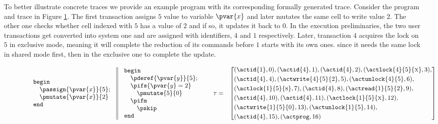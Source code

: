 To better illustrate concrete traces we provide an example program with its corresponding formally generated trace. Consider the program and trace in Figure \ref{fig:2pltrace}. The first transaction assigns $5$ value to variable $\pvar{x}$ and later mutates the same cell to write value $2$. The other one checks whether cell indexed with $5$ has a value of $2$ and if so, it updates it back to $0$. In the execution preliminaries, the two user transactions get converted into system one and are assigned with identifiers, $4$ and $1$ respectively. Later, transaction $4$ acquires the lock on $5$ in exclusive mode, meaning it will complete the reduction of its commands before $1$ starts with its own ones. since it needs the same lock in shared mode first, then in the exclusive one to complete the update.

\begin{figure}
\[
	\begin{array}{l r}
		\begin{array}{l || l}
			\begin{array}{l}
				\mathtt{begin} \\
					\quad \passign{\pvar{x}}{5} ; \\
					\quad \pmutate{\pvar{x}}{2} \\
				\mathtt{end}
			\end{array}
				&
			\begin{array}{l}
				\mathtt{begin} \\
					\quad \pderef{\pvar{y}}{5} ; \\
					\quad \pifs{\pvar{y} = 2} \\
					\quad \quad \pmutate{5}{0} \\
					\quad \pifm \\
					\quad \quad \pskip \\
				\mathtt{end}
			\end{array}
		\end{array}
		&
		\begin{array}{r l}
			\tau =
			&
			\left[
			\begin{aligned}
				&(\actid{1}, 0), (\actid{4}, 1), (\actid{4}, 2), (\actlock{4}{5}{\textsc{x}}, 3), \\
				&(\actid{4}, 4), (\actwrite{4}{5}{2}, 5), (\actunlock{4}{5}, 6), \\
				&(\actlock{1}{5}{\textsc{s}}, 7), (\actid{4}, 8), (\actread{1}{5}{2}, 9), \\
				&(\actid{4}, 10), (\actid{4}, 11), (\actlock{1}{5}{\textsc{x}}, 12), \\
				&(\actwrite{1}{5}{0}, 13),  (\actunlock{1}{5}, 14), \\
				&(\actid{4}, 15), (\actprog, 16)
			\end{aligned}
			\right]
		\end{array}
	\end{array}
\]
\label{fig:2pltrace}
\end{figure}

